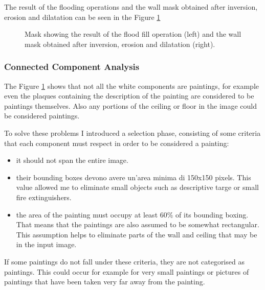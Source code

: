 \documentclass[10pt,twocolumn,letterpaper]{article}
\begin{document}
The result of the flooding operations and the wall mask obtained after inversion, erosion and dilatation can be seen in the Figure \ref{fig:maskLargestSegmentInveted} 

\begin{figure}[t]
   \begin{center}
   \fbox{\rule{0pt}{2in} \rule{0.9\linewidth}{0pt}}
   \end{center}
      \caption{Mask showing the result of the flood fill operation (left) and the wall mask obtained after inversion, erosion and dilatation (right).}
   \label{fig:maskLargestSegmentInveted}
\end{figure}

\subsubsection{Connected Component Analysis}

The Figure \ref{fig:maskLargestSegmentInveted} shows that not all the white components are paintings, for example even the plaques containing the description of the painting are considered to be paintings themselves. Also any portions of the ceiling or floor in the image could be considered paintings.

To solve these problems I introduced a selection phase, consisting of some criteria that each component must respect in order to be considered a painting:
\begin{itemize}
   \item it should not span the entire image.
   \item their bounding boxes devono avere un'area minima di 150x150 pixels. This value allowed me to eliminate small objects such as descriptive targe or small fire extinguishers.
   \item the area of ​​the painting must occupy at least 60\% of its bounding boxing. That means that the paintings are also assumed to be somewhat rectangular. This assumption helps to eliminate parts of the wall and ceiling that may be in the input image.
\end{itemize}

If some paintings do not fall under these criteria, they are not categorised as paintings. This could occur for example for very small paintings or pictures of paintings that have been taken very far away from the painting.
\end{document}
